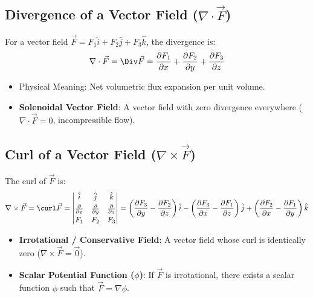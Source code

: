 \subsection{Divergence of a Vector Field ($\nabla\cdot\vec{F}$)}

\begin{definition}
For a vector field $\vec{F} = F_1\hat{i} + F_2\hat{j} + F_3\hat{k}$, the divergence is:
\begin{equation}
    \nabla\cdot\vec{F} = \Div\vec{F} = \frac{\partial F_1}{\partial x} + \frac{\partial F_2}{\partial y} + \frac{\partial F_3}{\partial z}
\end{equation}
\begin{itemize}[leftmargin=1.5em]
    \item Physical Meaning: Net volumetric flux expansion per unit volume.
    \item \textbf{Solenoidal Vector Field}: A vector field with zero divergence everywhere ($\nabla\cdot\vec{F} = 0$, incompressible flow).
\end{itemize}
\end{definition}

\subsection{Curl of a Vector Field ($\nabla\times\vec{F}$)}

\begin{definition}
The curl of $\vec{F}$ is:
\begin{equation}
    \nabla\times\vec{F} = \curl\vec{F} = \begin{vmatrix} \hat{i} & \hat{j} & \hat{k} \\[0.3em] \frac{\partial}{\partial x} & \frac{\partial}{\partial y} & \frac{\partial}{\partial z} \\[0.3em] F_1 & F_2 & F_3 \end{vmatrix} = \left(\frac{\partial F_3}{\partial y} - \frac{\partial F_2}{\partial z}\right)\hat{i} - \left(\frac{\partial F_3}{\partial x} - \frac{\partial F_1}{\partial z}\right)\hat{j} + \left(\frac{\partial F_2}{\partial x} - \frac{\partial F_1}{\partial y}\right)\hat{k}
\end{equation}
\begin{itemize}[leftmargin=1.5em]
    \item \textbf{Irrotational / Conservative Field}: A vector field whose curl is identically zero ($\nabla\times\vec{F} = \vec{0}$).
    \item \textbf{Scalar Potential Function ($\phi$)}: If $\vec{F}$ is irrotational, there exists a scalar function $\phi$ such that $\vec{F} = \nabla\phi$.
\end{itemize}
\end{definition}

